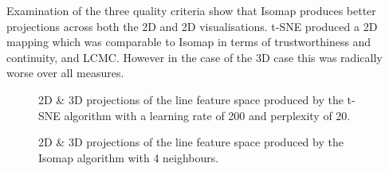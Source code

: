 Examination of the three quality criteria show that Isomap produces better projections across both the 2D and 2D visualisations. t-SNE produced a 2D mapping which was comparable to Isomap in terms of trustworthiness and continuity, and LCMC. However in the case of the 3D case this was radically worse over all measures.

\begin{figure}[H]
	\centering
	\caption{2D \& 3D projections of the line feature space produced by the t-SNE algorithm with a learning rate of 200 and perplexity of 20.}\label{fig:line_SNE_mapping}
\end{figure}

\begin{figure}[H]
	\centering
	\caption{2D \& 3D projections of the line feature space  produced by the Isomap algorithm with 4 neighbours.}\label{fig:line_iso_mapping}
\end{figure}

